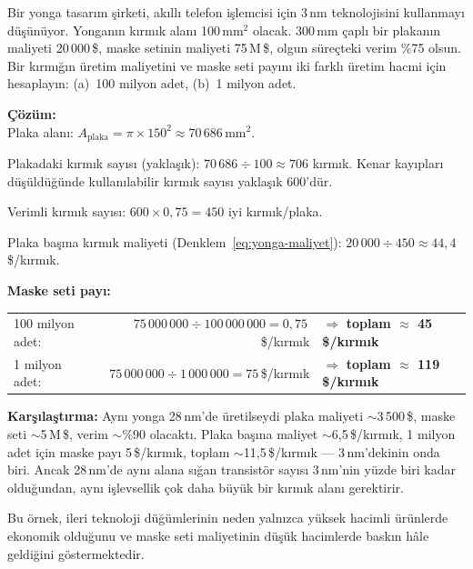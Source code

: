 \begin{ornek}[1.1]
Bir yonga tasarım şirketi, akıllı telefon işlemcisi için 3\,nm teknolojisini kullanmayı düşünüyor. Yonganın kırmık alanı 100\,mm$^2$ olacak. 300\,mm çaplı bir plakanın maliyeti 20\,000\,\$, maske setinin maliyeti 75\,M\,\$, olgun süreçteki verim \%75 olsun. Bir kırmığın üretim maliyetini ve maske seti payını iki farklı üretim hacmi için hesaplayın: (a)~100 milyon adet, (b)~1 milyon adet.

\textbf{Çözüm:}\\
Plaka alanı: $A_\text{plaka} = \pi \times 150^2 \approx 70\,686$\,mm$^2$.

Plakadaki kırmık sayısı (yaklaşık): $70\,686 \div 100 \approx 706$ kırmık. Kenar kayıpları düşüldüğünde kullanılabilir kırmık sayısı yaklaşık 600'dür.

Verimli kırmık sayısı: $600 \times 0{,}75 = 450$ iyi kırmık/plaka.

Plaka başına kırmık maliyeti (Denklem~\ref{eq:yonga-maliyet}): $20\,000 \div 450 \approx 44{,}4$\,\$/kırmık.

\medskip
\textbf{Maske seti payı:}

\smallskip
\begin{tabular}{@{}lrl@{}}
100 milyon adet: & $75\,000\,000 \div 100\,000\,000 = 0{,}75$\,\$/kırmık & $\Rightarrow$ \textbf{toplam $\approx$ 45\,\$/kırmık} \\[4pt]
1 milyon adet:   & $75\,000\,000 \div 1\,000\,000 = 75$\,\$/kırmık     & $\Rightarrow$ \textbf{toplam $\approx$ 119\,\$/kırmık}
\end{tabular}

\medskip
\textbf{Karşılaştırma:} Aynı yonga 28\,nm'de üretilseydi plaka maliyeti ${\sim}$3\,500\,\$, maske seti ${\sim}$5\,M\,\$, verim ${\sim}$\%90 olacaktı. Plaka başına maliyet ${\sim}$6{,}5\,\$/kırmık, 1 milyon adet için maske payı 5\,\$/kırmık, toplam ${\sim}$11{,}5\,\$/kırmık --- 3\,nm'dekinin onda biri. Ancak 28\,nm'de aynı alana sığan transistör sayısı 3\,nm'nin yüzde biri kadar olduğundan, aynı işlevsellik çok daha büyük bir kırmık alanı gerektirir.

Bu örnek, ileri teknoloji düğümlerinin neden yalnızca yüksek hacimli ürünlerde ekonomik olduğunu ve maske seti maliyetinin düşük hacimlerde baskın hâle geldiğini göstermektedir.
\end{ornek}

